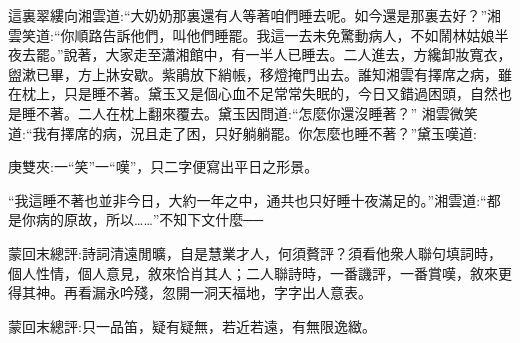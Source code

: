 \begin{parag}
    這裏翠縷向湘雲道:“大奶奶那裏還有人等著咱們睡去呢。如今還是那裏去好？”湘雲笑道:“你順路告訴他們，叫他們睡罷。我這一去未免驚動病人，不如鬧林姑娘半夜去罷。”說著，大家走至瀟湘館中，有一半人已睡去。二人進去，方纔卸妝寬衣，盥漱已畢，方上牀安歇。紫鵑放下綃帳，移燈掩門出去。誰知湘雲有擇席之病，雖在枕上，只是睡不著。黛玉又是個心血不足常常失眠的，今日又錯過困頭，自然也是睡不著。二人在枕上翻來覆去。黛玉因問道:“怎麼你還沒睡著？” 湘雲微笑道:“我有擇席的病，況且走了困，只好躺躺罷。你怎麼也睡不著？”黛玉嘆道:\begin{note}庚雙夾:一“笑”一“嘆”，只二字便寫出平日之形景。\end{note}“我這睡不著也並非今日，大約一年之中，通共也只好睡十夜滿足的。”湘雲道:“都是你病的原故，所以……”不知下文什麼──
\end{parag}


\begin{parag}
    \begin{note}蒙回末總評:詩詞清遠閒曠，自是慧業才人，何須贅評？須看他衆人聯句填詞時，個人性情，個人意見，敘來恰肖其人；二人聯詩時，一番譏評，一番賞嘆，敘來更得其神。再看漏永吟殘，忽開一洞天福地，字字出人意表。\end{note}
\end{parag}


\begin{parag}
    \begin{note}蒙回末總評:只一品笛，疑有疑無，若近若遠，有無限逸緻。\end{note}
\end{parag}